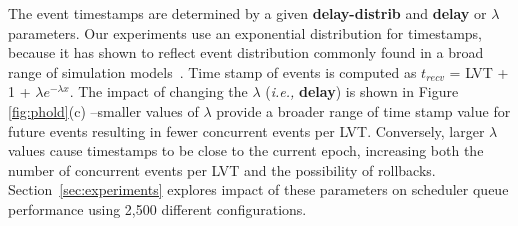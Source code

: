 The event timestamps are determined by a given \textbf{delay\--distrib} and \textbf{delay} or $\lambda$ parameters. Our experiments use an exponential distribution for timestamps, because it has shown to reflect event distribution commonly found in a broad range of simulation models~\cite{tang-05}. Time stamp of events is computed as $t_{recv}$ = LVT + 1 + $\lambda e^{-\lambda x}$. The impact of changing the $\lambda$ (\textit{i.e.,} \textbf{delay}) is shown in Figure \ref{fig:phold}(c) --smaller values of $\lambda$ provide a broader range of time stamp value for future events resulting in fewer concurrent events per LVT. Conversely, larger $\lambda$ values cause timestamps to be close to the current epoch, increasing both the number of concurrent events per LVT and the possibility of rollbacks. Section~\ref{sec:experiments} explores impact of these parameters on scheduler queue performance using 2,500 different configurations.

